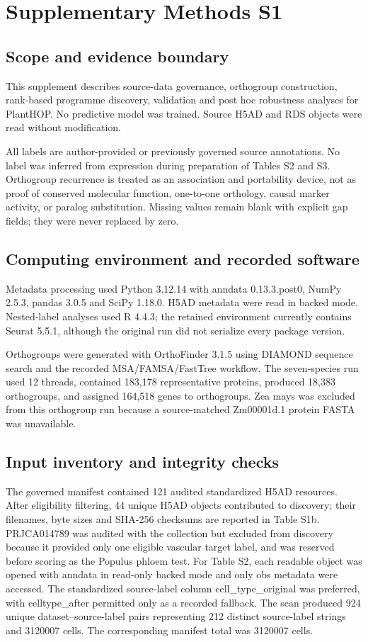 \section*{Supplementary Methods S1}
\providecommand{\suppmethodsection}[1]{\subsection*{#1}}

\suppmethodsection{Scope and evidence boundary}

This supplement describes source-data governance, orthogroup construction, rank-based programme discovery, validation and post hoc robustness analyses for PlantHOP. No predictive model was trained. Source H5AD and RDS objects were read without modification.

All labels are author-provided or previously governed source annotations. No label was inferred from expression during preparation of Tables S2 and S3. Orthogroup recurrence is treated as an association and portability device, not as proof of conserved molecular function, one-to-one orthology, causal marker activity, or paralog substitution. Missing values remain blank with explicit gap fields; they were never replaced by zero.

\suppmethodsection{Computing environment and recorded software}

Metadata processing used Python 3.12.14 with anndata 0.13.3.post0, NumPy 2.5.3, pandas 3.0.5 and SciPy 1.18.0. H5AD metadata were read in backed mode. Nested-label analyses used R 4.4.3; the retained environment currently contains Seurat 5.5.1, although the original run did not serialize every package version.

Orthogroups were generated with OrthoFinder 3.1.5 using DIAMOND sequence search and the recorded MSA/FAMSA/FastTree workflow. The seven-species run used 12 threads, contained 183,178 representative proteins, produced 18,383 orthogroups, and assigned 164,518 genes to orthogroups. Zea mays was excluded from this orthogroup run because a source-matched Zm00001d.1 protein FASTA was unavailable.

\suppmethodsection{Input inventory and integrity checks}

The governed manifest contained 121 audited standardized H5AD resources. After eligibility filtering, 44 unique H5AD objects contributed to discovery; their filenames, byte sizes and SHA-256 checksums are reported in Table S1b. PRJCA014789 was audited with the collection but excluded from discovery because it provided only one eligible vascular target label, and was reserved before scoring as the Populus phloem test. For Table S2, each readable object was opened with anndata in read-only backed mode and only obs metadata were accessed. The standardized source-label column cell\_type\_original was preferred, with celltype\_after permitted only as a recorded fallback. The scan produced 924 unique dataset--source-label pairs representing 212 distinct source-label strings and 3120007 cells. The corresponding manifest total was 3120007 cells.

